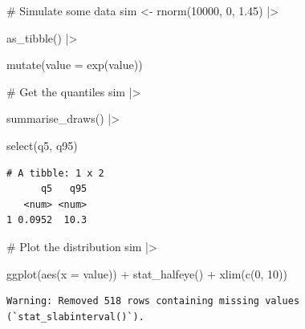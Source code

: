 \documentclass[
  letterpaper,
  DIV=11,
  numbers=noendperiod]{scrreprt}
\newenvironment{Shaded}{\begin{snugshade}}{\end{snugshade}}
\newcommand{\AttributeTok}[1]{\textcolor[rgb]{0.40,0.45,0.13}{#1}}
\newcommand{\CommentTok}[1]{\textcolor[rgb]{0.37,0.37,0.37}{#1}}
\newcommand{\DecValTok}[1]{\textcolor[rgb]{0.68,0.00,0.00}{#1}}
\newcommand{\FloatTok}[1]{\textcolor[rgb]{0.68,0.00,0.00}{#1}}
\newcommand{\FunctionTok}[1]{\textcolor[rgb]{0.28,0.35,0.67}{#1}}
\newcommand{\NormalTok}[1]{\textcolor[rgb]{0.00,0.23,0.31}{#1}}
\newcommand{\OtherTok}[1]{\textcolor[rgb]{0.00,0.23,0.31}{#1}}
\newcommand{\SpecialCharTok}[1]{\textcolor[rgb]{0.37,0.37,0.37}{#1}}
\begin{document}
\begin{Shaded}
\begin{Highlighting}[]
\CommentTok{\# Simulate some data}
\NormalTok{sim }\OtherTok{\textless{}{-}} \FunctionTok{rnorm}\NormalTok{(}\DecValTok{10000}\NormalTok{, }\DecValTok{0}\NormalTok{, }\FloatTok{1.45}\NormalTok{) }\SpecialCharTok{|\textgreater{}}

  \FunctionTok{as\_tibble}\NormalTok{() }\SpecialCharTok{|\textgreater{}}

  \FunctionTok{mutate}\NormalTok{(}\AttributeTok{value =} \FunctionTok{exp}\NormalTok{(value)) }

\CommentTok{\# Get the quantiles}
\NormalTok{sim }\SpecialCharTok{|\textgreater{}} 

  \FunctionTok{summarise\_draws}\NormalTok{() }\SpecialCharTok{|\textgreater{}}

  \FunctionTok{select}\NormalTok{(q5, q95)}
\end{Highlighting}
\end{Shaded}

\begin{verbatim}
# A tibble: 1 x 2
      q5   q95
   <num> <num>
1 0.0952  10.3
\end{verbatim}

\begin{Shaded}
\begin{Highlighting}[]
\CommentTok{\# Plot the distribution}
\NormalTok{sim }\SpecialCharTok{|\textgreater{}}

    \FunctionTok{ggplot}\NormalTok{(}\FunctionTok{aes}\NormalTok{(}\AttributeTok{x =}\NormalTok{ value)) }\SpecialCharTok{+}
    \FunctionTok{stat\_halfeye}\NormalTok{() }\SpecialCharTok{+}
    \FunctionTok{xlim}\NormalTok{(}\FunctionTok{c}\NormalTok{(}\DecValTok{0}\NormalTok{, }\DecValTok{10}\NormalTok{))}
\end{Highlighting}
\end{Shaded}

\begin{verbatim}
Warning: Removed 518 rows containing missing values (`stat_slabinterval()`).
\end{verbatim}
\end{document}
